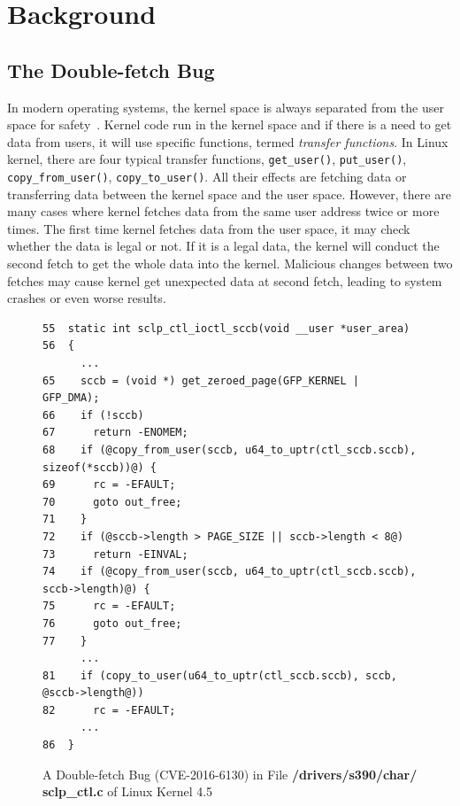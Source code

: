 \documentclass[10pt]{llncs}
\begin{document}
\section{Background}%
\label{back}


\subsection{The Double-fetch Bug}
\label{back1}
In modern operating systems, the kernel space is always separated from the user space for safety~\cite{swift2003improving}. Kernel code run in the kernel space and if there is a need to get data from users, it will use specific functions, termed \emph{transfer functions}. In Linux kernel, there are four typical transfer functions, \verb:get_user():, \verb:put_user():, \verb:copy_from_user():, \verb:copy_to_user():. All their effects are fetching data or transferring data between the kernel space and the user space. However, there are many cases where kernel fetches data from the same user address twice or more times. The first time kernel fetches data from the user space, it may check whether the data is legal or not. If it is a legal data, the kernel will conduct the second fetch to get the whole data into the kernel. Malicious changes between two fetches may cause kernel get unexpected data at second fetch, leading to system crashes or even worse results.


\begin{figure}[t]
  \centering
\begin{lstlisting}[style=code]
55  static int sclp_ctl_ioctl_sccb(void __user *user_area)
56  {
	  ...
65    sccb = (void *) get_zeroed_page(GFP_KERNEL | GFP_DMA);
66    if (!sccb)
67      return -ENOMEM;
68    if (@copy_from_user(sccb, u64_to_uptr(ctl_sccb.sccb), sizeof(*sccb))@) {
69      rc = -EFAULT;
70      goto out_free;
71    }
72    if (@sccb->length > PAGE_SIZE || sccb->length < 8@)
73      return -EINVAL;
74    if (@copy_from_user(sccb, u64_to_uptr(ctl_sccb.sccb), sccb->length)@) {
75      rc = -EFAULT;
76      goto out_free;
77    }
	  ...
81    if (copy_to_user(u64_to_uptr(ctl_sccb.sccb), sccb, @sccb->length@))
82      rc = -EFAULT;
  	  ...
86  }
\end{lstlisting}
  \caption{A Double-fetch Bug (CVE-2016-6130) in File \textbf{/drivers/s390/char/ sclp\_ctl.c} of Linux Kernel 4.5}
  \label{df-6130}
\end{figure}
\end{document}
